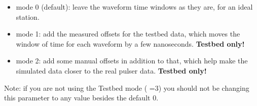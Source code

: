 \documentclass[a4paper,10pt]{article}
\newcommand{\p}[1]{\texttt{\StrSubstitute{#1}{ }{\char`_\hspace{0.5pt}}} \xspace} %
\newcommand{\tb}[1]{{\color{red}\textbf{#1}}} %
\begin{document}
\begin{itemize}
 
 \item mode 0 (default): leave the waveform time windows as they are, for an ideal station. 
 
 \item mode 1: add the measured offsets for the testbed data, which moves the window of time for each waveform by a few nanoseconds. \tb{Testbed only!}
 
 \item mode 2: add some manual offsets in addition to that, which help make the simulated data closer to the real pulser data. \tb{Testbed only!}
 
\end{itemize}

Note: if you are not using the Testbed mode (\p{DETECTOR}=3) you should not be changing this parameter to any value besides the default 0. 

\end{document}
